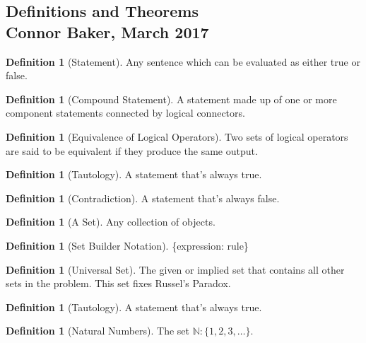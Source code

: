 \documentclass[10pt]{article}
\theoremstyle{definition}
\newtheorem{definition}[equation]{Definition}
\newcommand{\N}{\mathbb{N}}
\begin{document}
\begin{center}
  \subsection*{Definitions and Theorems\\Connor Baker, March 2017}
\end{center}

\begin{definition}[Statement]
  Any sentence which can be evaluated as either true or false.
\end{definition}

\begin{definition}[Compound Statement]
  A statement made up of one or more component statements connected by logical connectors.
\end{definition}

\begin{definition}[Equivalence of Logical Operators]
  Two sets of logical operators are said to be equivalent if they produce the same output.
\end{definition}

\begin{definition}[Tautology]
  A statement that's always true.
\end{definition}

\begin{definition}[Contradiction]
  A statement that's always false.
\end{definition}

\begin{definition}[A Set]
  Any collection of objects.
\end{definition}

\begin{definition}[Set Builder Notation]
  \{expression: rule\}
\end{definition}

\begin{definition}[Universal Set]
  The given or implied set that contains all other sets in the problem. This set fixes Russel's Paradox.
\end{definition}

\begin{definition}[Tautology]
  A statement that's always true.
\end{definition}

\begin{definition}[Natural Numbers]
  The set $\N: \{1,2,3, \dots \}$.
\end{definition}
\end{document}
